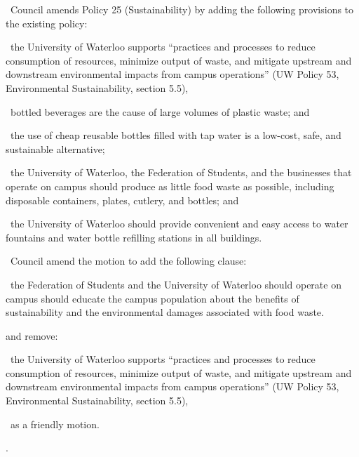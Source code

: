 \begin{motion}
    \birt\ Council amends Policy 25 (Sustainability) by adding the following
    provisions to the existing policy:
    \begin{motion}
        \whereas\ the University of Waterloo supports “practices and processes
        to reduce consumption of resources, minimize output of waste, and
        mitigate upstream and downstream environmental impacts from campus
        operations” (UW Policy 53, Environmental Sustainability, section 5.5),

        \whereas\ bottled beverages are the cause of large volumes of plastic
        waste; and

        \whereas\ the use of cheap reusable bottles filled with tap water is a
        low-cost, safe, and sustainable alternative;

        \bifrt\ the University of Waterloo, the Federation of Students, and the
        businesses that operate on campus should produce as little food waste
        as possible, including disposable containers, plates, cutlery, and
        bottles; and

        \bifrt\ the University of Waterloo should provide convenient and easy
        access to water fountains and water bottle refilling stations in all
        buildings.

    \end{motion}
    \movers{\jason}{\seneca}

    \begin{motion}

        \birt\ Council amend the motion to add the following clause:
        \begin{motion}
            \bifrt\ the Federation of Students and the University of Waterloo
            should operate on campus should educate the campus population about
            the benefits of sustainability and the environmental damages
            associated with food waste.
        \end{motion}
        and remove:
        \begin{motion}
            \whereas\ the University of Waterloo supports “practices and
            processes to reduce consumption of resources, minimize output of
            waste, and mitigate upstream and downstream environmental impacts
            from campus operations” (UW Policy 53, Environmental
            Sustainability, section 5.5),
        \end{motion}

        \carries\ as a friendly motion. 
    \end{motion}

    \carries.
\end{motion}

